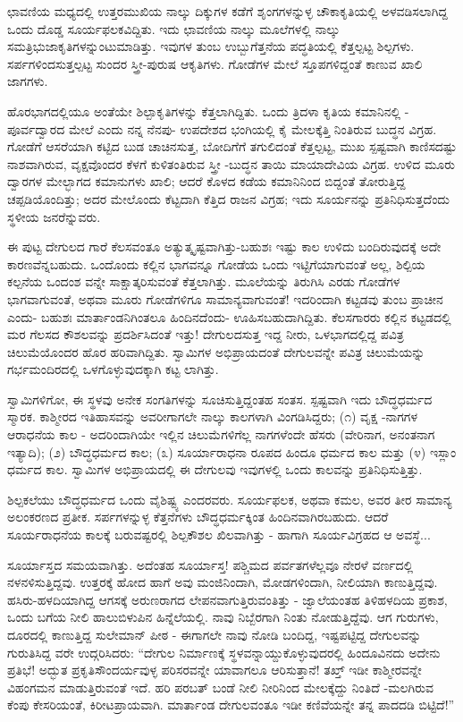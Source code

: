 ಛಾವಣಿಯ ಮಧ್ಯದಲ್ಲಿ ಉತ್ತರಮುಖಿಯ ನಾಲ್ಕು ದಿಕ್ಕುಗಳ ಕಡೆಗೆ ಶೃಂಗಗಳನ್ನುಳ್ಳ ಚೌಕಾಕೃತಿಯಲ್ಲಿ ಅಳವಡಿಸಲಾಗಿದ್ದ ಒಂದು ದೊಡ್ಡ ಸೂರ್ಯಫಲಕವಿದ್ದಿತು. ಇದು ಛಾವಣಿಯ ನಾಲ್ಕು ಮೂಲೆಗಳಲ್ಲಿ ನಾಲ್ಕು ಸಮತ್ರಿಭುಜಾಕೃತಿಗಳನ್ನುಂಟುಮಾಡಿತ್ತು. ಇವುಗಳ ತುಂಬ ಉಬ್ಬುಗೆತ್ತನೆಯ ಪದ್ಧತಿಯಲ್ಲಿ ಕೆತ್ತಲ್ಪಟ್ಟ ಶಿಲ್ಪಗಳು. ಸರ್ಪಗಳಿಂದಸುತ್ತಲ್ಪಟ್ಟ ಸುಂದರ ಸ್ತ್ರೀ-ಪುರುಷ ಆಕೃತಿಗಳು. ಗೋಡೆಗಳ ಮೇಲೆ ಸ್ತೂಪಗಳಿದ್ದಂತೆ ಕಾಣುವ ಖಾಲಿ ಜಾಗಗಳು.

ಹೊರಭಾಗದಲ್ಲಿಯೂ ಅಂತೆಯೇ ಶಿಲ್ಪಾಕೃತಿಗಳನ್ನು ಕೆತ್ತಲಾಗಿದ್ದಿತು. ಒಂದು ತ್ರಿದಳಾ ಕೃತಿಯ ಕಮಾನಿನಲ್ಲಿ - ಪೂರ್ವದ್ವಾರದ ಮೇಲೆ ಎಂದು ನನ್ನ ನೆನಪು- ಉಪದೇಶದ ಭಂಗಿಯಲ್ಲಿ ಕೈ ಮೇಲಕ್ಕೆತ್ತಿ ನಿಂತಿರುವ ಬುದ್ಧನ ವಿಗ್ರಹ. ಗೋಡೆಗೆ ಆಸರೆಯಾಗಿ ಕಟ್ಟಿದ ಬುಡ ಚಾಚಿನಸುತ್ತ, ಬೋದಿಗೆಗೆ ತಗುಲಿದಂತೆ ಕೆತ್ತಲ್ಪಟ್ಟ, ಮುಖ ಸ್ಪಷ್ಟವಾಗಿ ಕಾಣಿಸದಷ್ಟು ನಾಶವಾಗಿರುವ, ವೃಕ್ಷವೊಂದರ ಕೆಳಗೆ ಕುಳಿತಂತಿರುವ ಸ್ತ್ರೀ -ಬುದ್ಧನ ತಾಯಿ ಮಾಯಾದೇವಿಯ ವಿಗ್ರಹ. ಉಳಿದ ಮೂರು ದ್ವಾರಗಳ ಮೇಲ್ಭಾಗದ ಕಮಾನುಗಳು ಖಾಲಿ; ಆದರೆ ಕೊಳದ ಕಡೆಯ ಕಮಾನಿನಿಂದ ಬಿದ್ದಂತೆ ತೋರುತ್ತಿದ್ದ ಚಪ್ಪಡಿಯೊಂದಿತ್ತು; ಅದರ ಮೇಲೊಂದು ಕೆಟ್ಟದಾಗಿ ಕೆತ್ತಿದ ರಾಜನ ವಿಗ್ರಹ; ಇದು ಸೂರ್ಯನನ್ನು ಪ್ರತಿನಿಧಿಸುತ್ತದೆಂದು ಸ್ಥಳೀಯ ಜನರೆನ್ನುವರು.

ಈ ಪುಟ್ಟ ದೇಗುಲದ ಗಾರೆ ಕೆಲಸವಂತೂ ಅತ್ಯುತ್ಕೃಷ್ಟವಾಗಿತ್ತು-ಬಹುಶಃ ಇಷ್ಟು ಕಾಲ ಉಳಿದು ಬಂದಿರುವುದಕ್ಕೆ ಅದೇ ಕಾರಣವೆನ್ನಬಹುದು. ಒಂದೊಂದು ಕಲ್ಲಿನ ಭಾಗವನ್ನೂ ಗೋಡೆಯ ಒಂದು ಇಟ್ಟಿಗೆಯಾಗುವಂತೆ ಅಲ್ಲ, ಶಿಲ್ಪಿಯ ಕಲ್ಪನೆಯ ಒಂದಂಶ ವನ್ನೇ ಸಾಕ್ಷಾತ್ಕರಿಸುವಂತೆ ಕೆತ್ತಲಾಗಿತ್ತು. ಮೂಲೆಯನ್ನು ತಿರುಗಿಸಿ ಎರಡು ಗೋಡೆಗಳ ಭಾಗವಾಗುವಂತೆ, ಅಥವಾ ಮೂರು ಗೋಡೆಗಳಿಗೂ ಸಾಮಾನ್ಯವಾಗುವಂತೆ! ಇದರಿಂದಾಗಿ ಕಟ್ಟಡವು ತುಂಬ ಪ್ರಾಚೀನ ಎಂದು- ಬಹುಶಃ ಮಾರ್ತಾಂಡನಿಗಿಂತಲೂ ಹಿಂದಿನದೆಂದು- ಊಹಿಸಬಹುದಾಗಿದ್ದಿತು. ಕೆಲಸಗಾರರು ಕಲ್ಲಿನ ಕಟ್ಟಡದಲ್ಲಿ ಮರ ಗೆಲಸದ ಕೌಶಲವನ್ನು ಪ್ರದರ್ಶಿಸಿದಂತೆ ಇತ್ತು! ದೇಗುಲದಸುತ್ತ ಇದ್ದ ನೀರು, ಒಳಭಾಗದಲ್ಲಿದ್ದ ಪವಿತ್ರ ಚಿಲುಮೆಯೊಂದರ ಹೊರ ಹರಿವಾಗಿದ್ದಿತು. ಸ್ವಾಮಿಗಳ ಅಭಿಪ್ರಾಯದಂತೆ ದೇಗುಲವನ್ನೇ ಪವಿತ್ರ ಚಿಲುಮೆಯನ್ನು ಗರ್ಭಮಂದಿರದಲ್ಲಿ ಒಳಗೊಳ್ಳುವುದಕ್ಕಾಗಿ ಕಟ್ಟ ಲಾಗಿತ್ತು.

ಸ್ವಾಮಿಗಳಿಗೋ, ಈ ಸ್ಥಳವು ಅನೇಕ ಸಂಗತಿಗಳನ್ನು ಸೂಚಿಸುತ್ತಿದ್ದಂತಹ ಸಂತಸ. ಸ್ಪಷ್ಟವಾಗಿ ಇದು ಬೌದ್ಧಧರ್ಮದ ಸ್ಮಾರಕ. ಕಾಶ್ಮೀರದ ಇತಿಹಾಸವನ್ನು ಅವರೀಗಾಗಲೇ ನಾಲ್ಕು ಕಾಲಗಳಾಗಿ ವಿಂಗಡಿಸಿದ್ದರು; (೧) ವೃಕ್ಷ -ನಾಗಗಳ ಆರಾಧನೆಯ ಕಾಲ - ಅದರಿಂದಾಗಿಯೇ ಇಲ್ಲಿನ ಚಿಲುಮೆಗಳಿಗೆಲ್ಲ ನಾಗಗಳೆಂದೇ ಹೆಸರು (ವೇರಿನಾಗ, ಅನಂತನಾಗ ಇತ್ಯಾದಿ); (೨) ಬೌದ್ಧಧರ್ಮದ ಕಾಲ; (೩) ಸೂರ್ಯಾರಾಧನಾ ರೂಪದ ಹಿಂದೂ ಧರ್ಮದ ಕಾಲ ಮತ್ತು (೪) ಇಸ್ಲಾಂ ಧರ್ಮದ ಕಾಲ. ಸ್ವಾಮಿಗಳ ಅಭಿಪ್ರಾಯದಲ್ಲಿ ಈ ದೇಗುಲವು ಇವುಗಳಲ್ಲಿ ಒಂದು ಕಾಲವನ್ನು ಪ್ರತಿನಿಧಿಸುತ್ತಿತ್ತು.

ಶಿಲ್ಪಕಲೆಯು ಬೌದ್ಧಧರ್ಮದ ಒಂದು ವೈಶಿಷ್ಟ್ಯ ಎಂದರವರು. ಸೂರ್ಯಫಲಕ, ಅಥವಾ ಕಮಲ, ಅವರ ತೀರ ಸಾಮಾನ್ಯ ಅಲಂಕರಣದ ಪ್ರತೀಕ. ಸರ್ಪಗಳನ್ನುಳ್ಳ ಕೆತ್ತನೆಗಳು ಬೌದ್ಧಧರ್ಮಕ್ಕಿಂತ ಹಿಂದಿನವಾಗಿರಬಹುದು. ಆದರೆ ಸೂರ್ಯರಾಧನೆಯ ಕಾಲಕ್ಕೆ ಬರುವಷ್ಟರಲ್ಲಿ ಶಿಲ್ಪಕೌಶಲ ಖಿಲವಾಗಿತ್ತು - ಹಾಗಾಗಿ ಸೂರ್ಯವಿಗ್ರಹದ ಆ ಅವಸ್ಥೆ...

ಸೂರ್ಯಾಸ್ತದ ಸಮಯವಾಗಿತ್ತು. ಅದೆಂತಹ ಸೂರ್ಯಾಸ್ತ! ಪಶ್ಚಿಮದ ಪರ್ವತಗಳೆಲ್ಲವೂ ನೇರಳೆ ವರ್ಣದಲ್ಲಿ ನಳನಳಿಸುತ್ತಿದ್ದವು. ಉತ್ತರಕ್ಕೆ ಹೋದ ಹಾಗೆ ಅವು ಮಂಜಿನಿಂದಾಗಿ, ಮೋಡಗಳಿಂದಾಗಿ, ನೀಲಿಯಾಗಿ ಕಾಣುತ್ತಿದ್ದವು. ಹಸಿರು-ಹಳದಿಯಾಗಿದ್ದ ಆಗಸಕ್ಕೆ ಅರುಣರಾಗದ ಲೇಪನವಾಗುತ್ತಿರುವಂತಿತ್ತು - ಜ್ವಾಲೆಯಂತಹ ತಿಳಿಹಳದಿಯ ಪ್ರಕಾಶ, ಒಂದು ಬಗೆಯ ನೀಲಿ ಹಾಲುಬಿಳುಪಿನ ಹಿನ್ನೆಲೆಯಲ್ಲಿ. ನಾವು ನಿಬ್ಬೆರಗಾಗಿ ನಿಂತು ನೋಡುತ್ತಿದ್ದೆವು. ಆಗ ಗುರುಗಳು, ದೂರದಲ್ಲಿ ಕಾಣುತ್ತಿದ್ದ ಸುಲೇಮಾನ್ ಪೀಠ - ಈಗಾಗಲೇ ನಾವು ನೋಡಿ ಬಂದಿದ್ದ, ಇಷ್ಟಪಟ್ಟಿದ್ದ ದೇಗುಲವನ್ನು ಗುರುತಿಸಿದ್ದ ವರೇ ಉದ್ಗರಿಸಿದರು: “ದೇಗುಲ ನಿರ್ಮಾಣಕ್ಕೆ ಸ್ಥಳವನ್ನಾಯ್ದುಕೊಳ್ಳುವುದರಲ್ಲಿ ಹಿಂದೂವಿನದು ಅದೇನು ಪ್ರತಿಭೆ! ಅದ್ಭುತ ಪ್ರಕೃತಿಸೌಂದರ್ಯವುಳ್ಳ ಪರಿಸರವನ್ನೇ ಯಾವಾಗಲೂ ಆರಿಸುತ್ತಾನೆ! ತಖ್ತ್ ಇಡೀ ಕಾಶ್ಮೀರವನ್ನೇ ವಿಹಂಗಮನ ಮಾಡುತ್ತಿರುವಂತೆ ಇದೆ. ಹರಿ ಪರಬತ್ ಬಂಡೆ ನೀಲಿ ನೀರಿನಿಂದ ಮೇಲಕ್ಕೆದ್ದು ನಿಂತಿದೆ -ಮಲಗಿರುವ ಕೆಂಪು ಕೇಸರಿಯಂತೆ, ಕಿರೀಟಪ್ರಾಯವಾಗಿ. ಮಾರ್ತಾಂಡ ದೇಗುಲವಂತೂ ಇಡೀ ಕಣಿವೆಯನ್ನೇ ತನ್ನ ಪಾದದಡಿ ಬಿಟ್ಟಿದೆ!”

